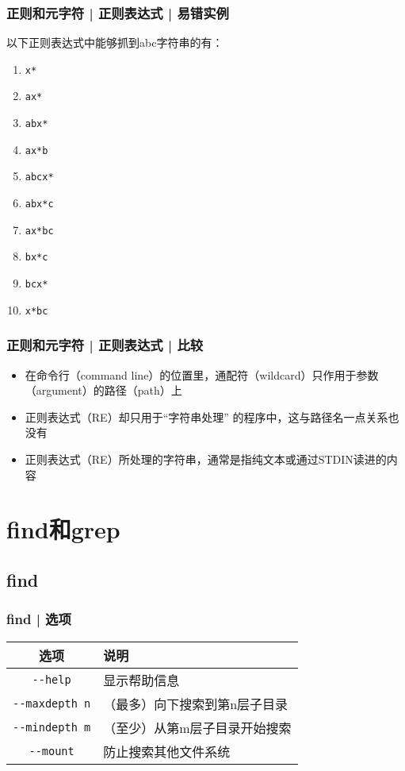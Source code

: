 \begin{frame}[fragile]
  \frametitle{正则和元字符 | 正则表达式 | 易错实例}
  \begin{block}{以下正则表达式中能够抓到abc字符串的有：}
    \begin{enumerate}
      \item \verb|x*|
      \item \verb|ax*|
      \item \verb|abx*|
      \item \verb|ax*b|
      \item \verb|abcx*|
      \item \verb|abx*c|
      \item \verb|ax*bc|
      \item \verb|bx*c|
      \item \verb|bcx*|
      \item \verb|x*bc|
    \end{enumerate}
  \end{block}
\end{frame}

\begin{frame}
  \frametitle{正则和元字符 | 正则表达式 | 比较}
  \begin{itemize}
    \item 在命令行（command line）的位置里，通配符（wildcard）只作用于参数（argument）的路径（path）上
    \item 正则表达式（RE）却只用于“字符串处理” 的程序中，这与路径名一点关系也没有
    \item 正则表达式（RE）所处理的字符串，通常是指纯文本或通过STDIN读进的内容
  \end{itemize}
\end{frame}


\section{find和grep}
\subsection{find}
\begin{frame}[fragile]
  \frametitle{find | 选项}
  \begin{table}
    \centering
    \begin{tabularx}{0.9\textwidth}{cX}
      \hline
      \rowcolor{blue!50}选项 & 说明\\
      \hline
      \verb|--help| & 显示帮助信息\\
      \verb|--maxdepth n| & （最多）向下搜索到第n层子目录\\
      \verb|--mindepth m| & （至少）从第m层子目录开始搜索\\
      \verb|--mount| & 防止搜索其他文件系统\\
      \hline
    \end{tabularx}
  \end{table}
\end{frame}

